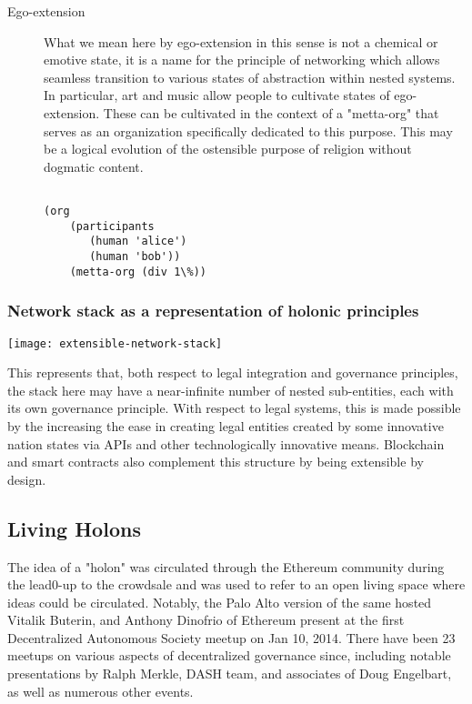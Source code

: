 \documentclass{article}
\begin{document}
\begin{description}
\item[Ego-extension]

What we mean here by ego-extension in this sense is not a chemical or emotive state, it is a name for the principle of networking which allows seamless transition to various states of abstraction within nested systems. In particular, art and music allow people to cultivate states of ego-extension. These can be cultivated in the context of a "metta-org" that serves as an organization specifically dedicated to this purpose. This may be a logical evolution of the ostensible purpose of religion without dogmatic content.

\begin{lstlisting}

(org
    (participants
       (human 'alice')
       (human 'bob'))
    (metta-org (div 1\%))
\end{lstlisting}


\end{description}

\subsubsection {Network stack as a representation of holonic principles }

\texttt{[image: extensible-network-stack]}


This represents that, both respect to legal integration and governance principles, the stack here may have a near-infinite number of nested sub-entities, each with its own governance principle. With respect to legal systems, this is made possible by the increasing the ease in creating legal entities created by some innovative nation states via APIs and other technologically innovative means. Blockchain and smart contracts also complement this structure by being extensible by design.



\subsection {Living Holons}

The idea of a "holon" was circulated through the Ethereum community during the lead0-up to the crowdsale and was used to refer to an open living space where ideas could be circulated. Notably, the Palo Alto version of the same hosted Vitalik Buterin, and Anthony Dinofrio of Ethereum present at the first Decentralized Autonomous Society meetup on Jan 10, 2014. There have been 23 meetups on various aspects of decentralized governance since, including notable presentations by Ralph Merkle, DASH team, and associates of Doug Engelbart, as well as numerous other events.\cite{lovenestguide}
\end{document}
